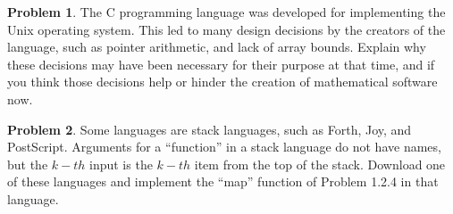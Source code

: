 \documentclass{article}
\theoremstyle{definition}
\newtheorem{problem}{Problem}[subsection]
\begin{document}
	\newpage
	\setcounter{problem}{5}
	\begin{problem}
	The C programming language was developed for implementing the Unix operating
	system. This led to many design decisions by the creators of the language,
	such as pointer arithmetic, and lack of array bounds. Explain why these decisions
	may have been necessary for their purpose at that time, and if you think those
	decisions help or hinder the creation of mathematical software now.
	\end{problem}
	
	\newpage
	\setcounter{problem}{6}
	\begin{problem}
		Some languages are stack languages, such as Forth, Joy, and PostScript. Arguments
		for a “function” in a stack language do not have names, but the \(k-th\) input
		is the \(k-th\) item from the top of the stack. Download one of these languages and implement the “map” function of Problem 1.2.4 in that language.
	\end{problem}
	
\end{document}
